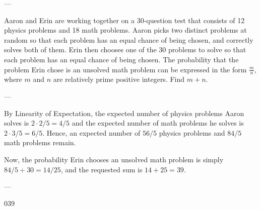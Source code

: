 
---

Aaron and Erin are working together on a 30-question test that consists of 12 physics problems and 18 math problems. Aaron picks two distinct problems at random so that each problem has an equal chance of being chosen, and correctly solves both of them. Erin then chooses one of the 30 problems to solve so that each problem has an equal chance of being chosen. The probability that the problem Erin chose is an unsolved math problem can be expressed in the form $\tfrac mn$, where $m$ and $n$ are relatively prime positive integers. Find $m+n$.

---

By Linearity of Expectation, the expected number of physics problems Aaron solves is $2\cdot 2/5=4/5$ and the expected number of math problems he solves is $2\cdot 3/5=6/5$. Hence, an expected number of $56/5$ physics problems and $84/5$ math problems remain.

Now, the probability Erin chooses an unsolved math problem is simply $84/5\div 30=14/25$, and the requested sum is $14+25=39$.

---

039

